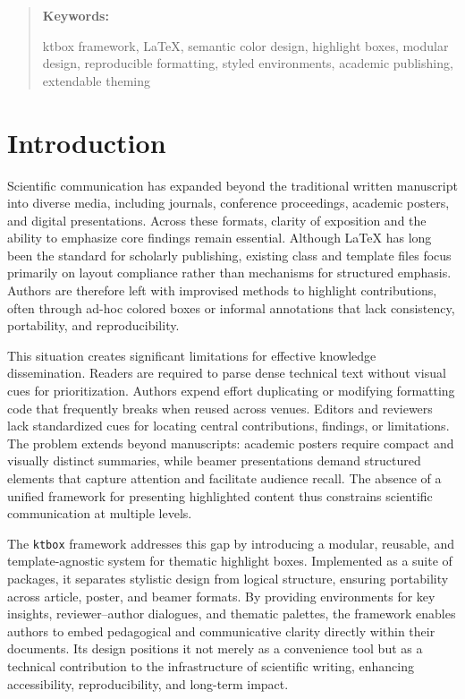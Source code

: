 \documentclass[12pt,onecolumn]{article}
\newenvironment{keywords}{
  \begin{quote}\small\textbf{Keywords:}%
}{\end{quote}}
\begin{document}
  \begin{keywords}
ktbox framework, LaTeX, semantic color design, highlight boxes, modular design, reproducible formatting, styled environments, academic publishing, extendable theming


  \end{keywords}


  \section{Introduction}
  \label{sec:introduction}
Scientific communication has expanded beyond the traditional written manuscript into diverse media, including journals, conference proceedings, academic posters, and digital presentations. Across these formats, clarity of exposition and the ability to emphasize core findings remain essential. Although \LaTeX{} has long been the standard for scholarly publishing, existing class and template files focus primarily on layout compliance rather than mechanisms for structured emphasis. Authors are therefore left with improvised methods to highlight contributions, often through ad-hoc colored boxes or informal annotations that lack consistency, portability, and reproducibility.

This situation creates significant limitations for effective knowledge dissemination. Readers are required to parse dense technical text without visual cues for prioritization. Authors expend effort duplicating or modifying formatting code that frequently breaks when reused across venues. Editors and reviewers lack standardized cues for locating central contributions, findings, or limitations. The problem extends beyond manuscripts: academic posters require compact and visually distinct summaries, while beamer presentations demand structured elements that capture attention and facilitate audience recall. The absence of a unified framework for presenting highlighted content thus constrains scientific communication at multiple levels.

The \texttt{ktbox} framework addresses this gap by introducing a modular, reusable, and template-agnostic system for thematic highlight boxes. Implemented as a suite of packages, it separates stylistic design from logical structure, ensuring portability across article, poster, and beamer formats. By providing environments for key insights, reviewer–author dialogues, and thematic palettes, the framework enables authors to embed pedagogical and communicative clarity directly within their documents. Its design positions it not merely as a convenience tool but as a technical contribution to the infrastructure of scientific writing, enhancing accessibility, reproducibility, and long-term impact.
\end{document}
